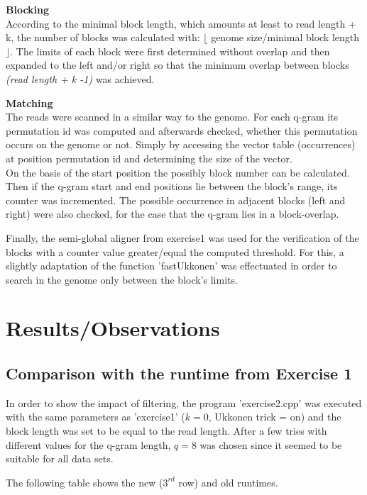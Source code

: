 \documentclass[11pt, notitlepage]{scrartcl}
\begin{document}
\textbf{Blocking}\\
According to the minimal block length, which amounts at least to read length + k, the number of blocks was calculated with: $\lfloor$ genome size/minimal block length$\rfloor$. The limits of each block were first determined without overlap and then expanded to the left and/or right so that the minimum overlap between blocks \textit{(read length + k -1)} was achieved.

\textbf{Matching}\\
The reads were scanned in a similar way to the genome. For each q-gram its permutation id was computed and afterwards checked, whether this permutation occurs on the genome or not. Simply by accessing the vector table (occurrences) at position permutation id and determining the size of the vector.\\
On the basis of the start position the possibly block number can be calculated. Then if the q-gram start and end positions lie between the block's range, its counter was incremented. The possible occurrence in adjacent blocks (left and right) were also checked, for the case that the q-gram lies in a block-overlap.

Finally, the semi-global aligner from exercise1 was used for the verification of the blocks with a counter value greater/equal the computed threshold. For this, a slightly adaptation of the function 'fastUkkonen' was effectuated in order to search in the genome only between the block's limits. 

\section{Results/Observations}
\subsection{Comparison with the runtime from Exercise 1}
In order to show the impact of filtering, the program 'exercise2.cpp' was executed with the same parameters as 'exercise1' ($k=0$, Ukkonen trick = on) and the block length was set to be equal to the read length. After a few tries with different values for the q-gram length, $q=8$ was chosen since it seemed to be suitable for all data sets.

The following table shows the new  ($3^{rd}$ row) and old runtimes.
\end{document}
